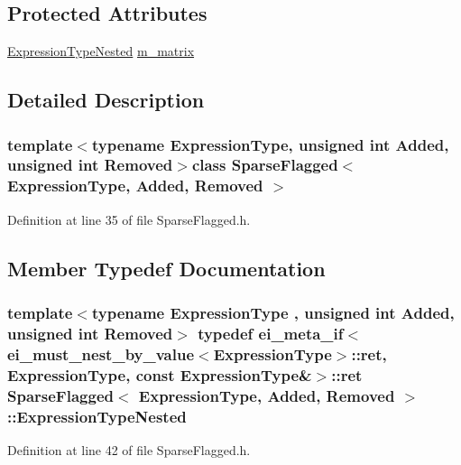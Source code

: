 \subsection*{Protected Attributes}
\begin{DoxyCompactItemize}
\item 
\hyperlink{class_sparse_flagged_a418bcbaf56ee186affbad6a4cd3dab43}{Expression\-Type\-Nested} \hyperlink{class_sparse_flagged_aa4693666391f31393215b87bee59d7c9}{m\-\_\-matrix}
\end{DoxyCompactItemize}


\subsection{Detailed Description}
\subsubsection*{template$<$typename Expression\-Type, unsigned int Added, unsigned int Removed$>$class Sparse\-Flagged$<$ Expression\-Type, Added, Removed $>$}



Definition at line 35 of file Sparse\-Flagged.\-h.



\subsection{Member Typedef Documentation}
\hypertarget{class_sparse_flagged_a418bcbaf56ee186affbad6a4cd3dab43}{
\subsubsection[{Expression\-Type\-Nested}]{\setlength{\rightskip}{0pt plus 5cm}template$<$typename Expression\-Type , unsigned int Added, unsigned int Removed$>$ typedef {\bf ei\-\_\-meta\-\_\-if}$<${\bf ei\-\_\-must\-\_\-nest\-\_\-by\-\_\-value}$<$Expression\-Type$>$\-::{\bf ret}, Expression\-Type, const Expression\-Type\&$>$\-::{\bf ret} {\bf Sparse\-Flagged}$<$ Expression\-Type, Added, Removed $>$\-::{\bf Expression\-Type\-Nested}}}\label{class_sparse_flagged_a418bcbaf56ee186affbad6a4cd3dab43}


Definition at line 42 of file Sparse\-Flagged.\-h.




